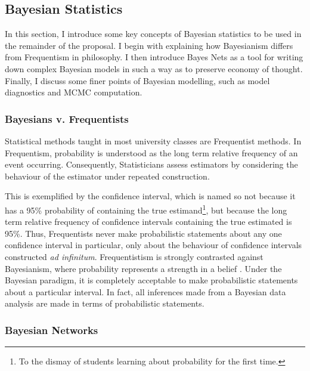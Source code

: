 \subsection{Bayesian Statistics}

In this section, I introduce some key concepts of Bayesian statistics to be used in the remainder of the proposal.  I begin with explaining how Bayesianism differs from Frequentism in philosophy.  I then introduce Bayes Nets as a tool for writing down complex Bayesian models in such a way as to preserve economy of thought.  Finally, I discuss some finer points of Bayesian modelling, such as model diagnostics and MCMC computation.


\subsubsection{Bayesians v. Frequentists}

Statistical methods taught in most  university classes are Frequentist methods.  In Frequentism, probability is understood as the long term relative frequency of an event occurring.  Consequently, Statisticians assess estimators by considering the behaviour of the estimator under repeated construction.  

This is exemplified by the confidence interval, which is named so not because it has a 95\% probability of containing the true estimand\footnote{To the dismay of students learning about probability for the first time.}, but because the long term relative frequency of confidence intervals containing the true estimated is 95\%.  Thus, Frequentists never make probabilistic statements about any one confidence interval in particular, only about the behaviour of confidence intervals constructed \textit{ad infinitum}.  Frequentistism is strongly contrasted against Bayesianism, where probability represents a strength in a belief \cite{gelman2013bayesian}.  Under the Bayesian paradigm, it is completely acceptable to make probabilistic statements about a particular interval.  In fact, all inferences made from a Bayesian data analysis are made in terms of probabilistic statements.


\subsubsection{Bayesian Networks}

